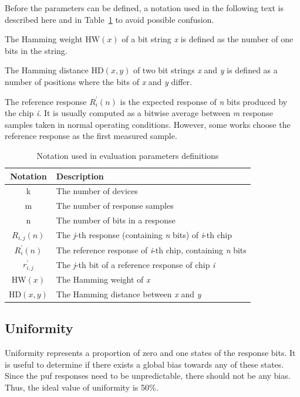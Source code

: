 Before the parameters can be defined, a notation used in the following text is described here and in Table~\ref{table:notation} to avoid possible confusion.

The Hamming weight $\textrm{HW}(x)$ of a bit string \emph{x} is defined as the number of one bits in the string. 

The Hamming distance $\textrm{HD}(x, y)$ of two bit strings \emph{x} and \emph{y} is defined as a number of positions where the bits of \emph{x} and \emph{y} differ.

The reference response $R_{i}^{'}(n)$ is the expected response of \emph{n} bits produced by the chip \emph{i}. It is usually computed as a bitwise average between \emph{m} response samples taken in normal operating conditions. However, some works choose the reference response as the first measured sample.\cite{Kodytek2020}

\begin{table}[h!]
\centering
\begin{tabular}{c l} 
     Notation & Description\\
     \hline
     k & The number of devices\\ 
     m & The number of response samples\\
     n & The number of bits in a response\\ 
     $R_{i,j}(n)$ & The \emph{j}-th response (containing \emph{n} bits) of \emph{i}-th chip\\ 
     $R_{i}^{'}(n)$ & The reference response of \emph{i}-th chip, containing \emph{n} bits\\ 
     $r_{i,j}^{'}$ & The \emph{j}-th bit of a reference response of chip \emph{i}\\
     $\textrm{HW}(x)$ & The Hamming weight of \emph{x}\\
     $\textrm{HD}(x, y)$ & The Hamming distance between \emph{x} and \emph{y}\\
     \hline
    \end{tabular}
    \captionsetup{justification=centering,margin=0.5cm}
    \caption{Notation used in evaluation parameters definitions}
    \label{table:notation}
\end{table}

\subsection{Uniformity}\label{sec:uniformity}

Uniformity represents a proportion of zero and one states of the response bits. It is useful to determine if there exists a global bias towards any of these states. Since the \gls{puf} responses need to be unpredictable, there should not be any bias. Thus, the ideal value of uniformity is 50\%.

